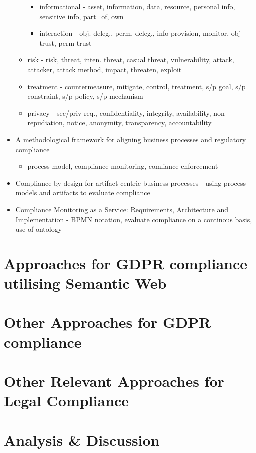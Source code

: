 \begin{itemize}
\begin{itemize}
\begin{itemize}
		\item informational - asset, information, data, resource, personal info, sensitive info, part\_of, own
		\item interaction - obj. deleg., perm. deleg., info provision, monitor, obj trust, perm trust
		\end{itemize}
	\item risk - risk, threat, inten. threat, casual threat, vulnerability, attack, attacker, attack method, impact, threaten, exploit
	\item treatment - countermeasure, mitigate, control, treatment, s/p goal, s/p constraint, s/p policy, s/p mechanism
	\item privacy - sec/priv req., confidentiality, integrity, availability, non-repudiation, notice, anonymity, transparency, accountability
	\end{itemize}
\item A methodological framework for aligning business processes and regulatory compliance
	\begin{itemize}
	\item process model, compliance monitoring, comliance enforcement
	\end{itemize}
\item Compliance by design for artifact-centric business processes - using process models and artifacts to evaluate compliance
\item Compliance Monitoring as a Service: Requirements, Architecture and Implementation - BPMN notation, evaluate compliance on a continous basis, use of ontology
\end{itemize}



\section{Approaches for GDPR compliance utilising Semantic Web}\label{sec:sota:gdpr-semweb}

\section{Other Approaches for GDPR compliance}\label{sec:sota:gdpr-other}

\section{Other Relevant Approaches for Legal Compliance}\label{sec:sota:other}

\section{Analysis \& Discussion}\label{sec:sota:analysis}